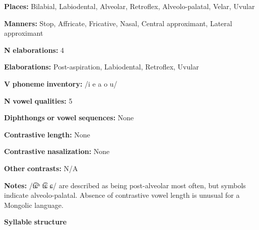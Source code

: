 \begin{styleBody}
\textbf{Places:} Bilabial, Labiodental, Alveolar, Retroflex, Alveolo-palatal, Velar, Uvular
\end{styleBody}

\begin{styleBody}
\textbf{Manners:} Stop, Affricate, Fricative, Nasal, Central approximant, Lateral approximant
\end{styleBody}

\begin{styleBody}
\textbf{N} \textbf{elaborations:} 4
\end{styleBody}

\begin{styleBody}
\textbf{Elaborations:} Post-aspiration, Labiodental, Retroflex, Uvular
\end{styleBody}

\begin{styleBody}
\textbf{V} \textbf{phoneme} \textbf{inventory:} /i e a o u/
\end{styleBody}

\begin{styleBody}
\textbf{N} \textbf{vowel} \textbf{qualities:} 5
\end{styleBody}

\begin{styleBody}
\textbf{Diphthongs} \textbf{or} \textbf{vowel} \textbf{sequences:} None
\end{styleBody}

\begin{styleBody}
\textbf{Contrastive} \textbf{length:} None
\end{styleBody}

\begin{styleBody}
\textbf{Contrastive} \textbf{nasalization:} None
\end{styleBody}

\begin{styleBody}
\textbf{Other} \textbf{contrasts:} N/A
\end{styleBody}

\begin{styleBody}
\textbf{Notes:} /t͡ɕʰ t͡ɕ ɕ/ are described as being post-alveolar most often, but symbols indicate alveolo-palatal. Absence of contrastive vowel length is unusual for a Mongolic language.
\end{styleBody}

\begin{styleBody}
\textbf{Syllable} \textbf{structure}
\end{styleBody}

